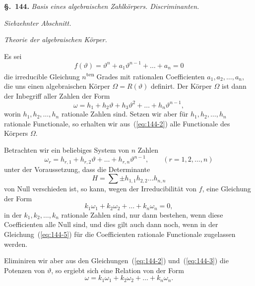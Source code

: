 \documentclass[12pt,a4paper]{article}
\theoremstyle{definition}
\begin{document}
\noindent\textbf{\S.~144.}\quad
\textit{Basis eines algebraischen Zahlkörpers. Discriminanten.}\par\medskip

\noindent\textit{Siebzehnter Abschnitt.}\par\smallskip
\textit{Theorie der algebraischen Körper.}\par\medskip

Es sei
\begin{equation}\label{eq:144-1}
f(\vartheta) = \vartheta^n + a_1\vartheta^{n-1} + \dots + a_n = 0
\end{equation}
die irreducible Gleichung $n$\textsuperscript{ten} Grades mit rationalen Coefficienten $a_1,a_2,\dots,a_n$, die uns einen algebraischen Körper $\Omega=R(\vartheta)$ definirt. Der Körper $\Omega$ ist dann der Inbegriff aller Zahlen der Form
\begin{equation}\label{eq:144-2}
\omega = h_1 + h_2\vartheta + h_3\vartheta^2 + \dots + h_n\vartheta^{n-1},
\end{equation}
worin $h_1,h_2,\dots,h_n$ rationale Zahlen sind. Setzen wir aber für $h_1,h_2,\dots,h_n$ rationale Functionale, so erhalten wir aus~(\ref{eq:144-2}) alle Functionale des Körpers $\Omega$.

Betrachten wir ein beliebiges System von $n$ Zahlen
\begin{equation}\label{eq:144-3}
\omega_r = h_{r,1} + h_{r,2}\vartheta + \dots + h_{r,n}\vartheta^{n-1},
\qquad (r=1,2,\dots,n)
\end{equation}
unter der Voraussetzung, dass die Determinante
\begin{equation}\label{eq:144-4}
H = \sum \pm h_{1,1} h_{2,2} \dots h_{n,n}
\end{equation}
von Null verschieden ist, so kann, wegen der Irreducibilität von $f$, eine Gleichung der Form
\begin{equation}\label{eq:144-5}
k_1\omega_1 + k_2\omega_2 + \dots + k_n\omega_n = 0,
\end{equation}
in der $k_1,k_2,\dots,k_n$ rationale Zahlen sind, nur dann bestehen, wenn diese Coefficienten alle Null sind, und dies gilt auch dann noch, wenn in der Gleichung~(\ref{eq:144-5}) für die Coefficienten rationale Functionale zugelassen werden.

Eliminiren wir aber aus den Gleichungen~(\ref{eq:144-2}) und~(\ref{eq:144-3}) die Potenzen von $\vartheta$, so ergiebt sich eine Relation von der Form
\begin{equation}\label{eq:144-6}
\omega = k_1\omega_1 + k_2\omega_2 + \dots + k_n\omega_n.
\end{equation}
\end{document}
